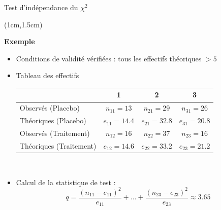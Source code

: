 \documentclass{beamer}
\begin{document}
\begin{frame}{Test d'indépendance du $\chi^2$}
\begin{textblock*}{\textwidth}(1cm,1.5cm)

\begin{center}{\bf \Large Exemple} \end{center}

\small 

\begin{itemize}
\item Conditions de validité vérifiées : tous les effectifs théoriques $> 5$ 
\item Tableau des effectifs

\scriptsize
\begin{tabular}{lccc}
\hline
        & 1 & 2 & 3 \\
\hline
Observés (Placebo) & $n_{11}=13$ & $n_{21}=29$ & $n_{31}=26$ \\
Théoriques (Placebo) & $e_{11}=14.4$ & $e_{21}=32.8$ & $e_{31}=20.8$ \\
\hline
Observés (Traitement) & $n_{12}=16$ & $n_{22}=37$ & $n_{23}=16$ \\
Théoriques (Traitement) & $e_{12}=14.6$ & $e_{22}=33.2$ & $e_{23}=21.2$\\
\hline
\end{tabular}
\normalsize

\ 

\item Calcul de la statistique de test : 
$$q  = \frac{(n_{11} - e_{11})^2}{e_{11}} + ... + \frac{(n_{23} - e_{23})^2}{e_{23}} \approx 3.65
$$
\normalsize

\end{itemize}

\end{textblock*}

\end{frame}

\end{document}
